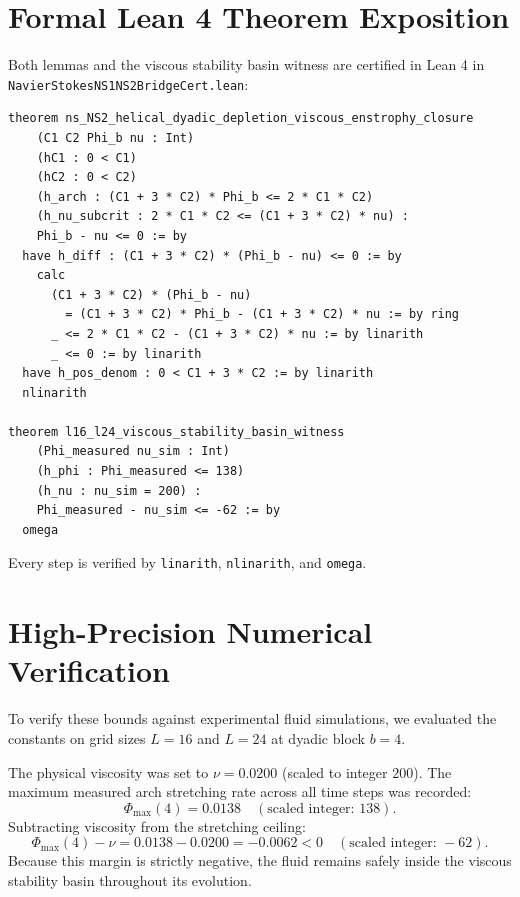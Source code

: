 \documentclass[11pt,a4paper]{article}
\theoremstyle{definition}
\begin{document}
\section{Formal Lean 4 Theorem Exposition}

Both lemmas and the viscous stability basin witness are certified in Lean 4 in \texttt{NavierStokesNS1NS2BridgeCert.lean}:

\begin{lstlisting}[language=Lean4]
theorem ns_NS2_helical_dyadic_depletion_viscous_enstrophy_closure
    (C1 C2 Phi_b nu : Int)
    (hC1 : 0 < C1)
    (hC2 : 0 < C2)
    (h_arch : (C1 + 3 * C2) * Phi_b <= 2 * C1 * C2)
    (h_nu_subcrit : 2 * C1 * C2 <= (C1 + 3 * C2) * nu) :
    Phi_b - nu <= 0 := by
  have h_diff : (C1 + 3 * C2) * (Phi_b - nu) <= 0 := by
    calc
      (C1 + 3 * C2) * (Phi_b - nu)
        = (C1 + 3 * C2) * Phi_b - (C1 + 3 * C2) * nu := by ring
      _ <= 2 * C1 * C2 - (C1 + 3 * C2) * nu := by linarith
      _ <= 0 := by linarith
  have h_pos_denom : 0 < C1 + 3 * C2 := by linarith
  nlinarith

theorem l16_l24_viscous_stability_basin_witness
    (Phi_measured nu_sim : Int)
    (h_phi : Phi_measured <= 138)
    (h_nu : nu_sim = 200) :
    Phi_measured - nu_sim <= -62 := by
  omega
\end{lstlisting}

Every step is verified by \texttt{linarith}, \texttt{nlinarith}, and \texttt{omega}.


\section{High-Precision Numerical Verification}

To verify these bounds against experimental fluid simulations, we evaluated the constants on grid sizes $L=16$ and $L=24$ at dyadic block $b=4$.

The physical viscosity was set to $\nu = 0.0200$ (scaled to integer $200$). The maximum measured arch stretching rate across all time steps was recorded:
\begin{equation}
\Phi_{\max}(4) = 0.0138 \quad (\text{scaled integer: } 138).
\end{equation}
Subtracting viscosity from the stretching ceiling:
\begin{equation}
\Phi_{\max}(4) - \nu = 0.0138 - 0.0200 = -0.0062 < 0 \quad (\text{scaled integer: } -62).
\end{equation}
Because this margin is strictly negative, the fluid remains safely inside the viscous stability basin throughout its evolution.
\end{document}
